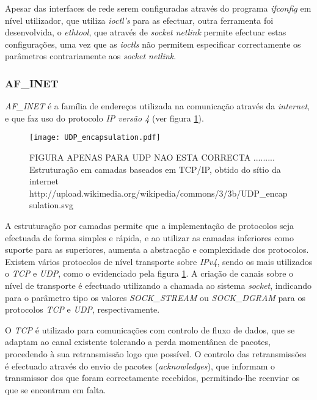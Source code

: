 Apesar das interfaces de rede serem configuradas através do programa \textit{ifconfig} em nível utilizador, que utiliza \textit{ioctl's} para as efectuar, outra ferramenta foi desenvolvida, o \textit{ethtool}, que através de \textit{socket netlink} permite efectuar estas configurações, uma vez que as \textit{ioctls} não permitem especificar correctamente os parâmetros contrariamente aos \textit{socket netlink}.

\subsubsection{AF\_INET}
\label{subsub:af_inet}

\textit{AF\_INET} é a família de endereços utilizada na comunicação através da \textit{internet}, e que faz uso do protocolo \textit{IP versão 4} (ver figura \ref{fig:stack_tcp_ip}).

\begin{figure}[ht]
\centering
\texttt{[image: UDP\_encapsulation.pdf]}
\caption{FIGURA APENAS PARA UDP NAO ESTA CORRECTA ......... Estruturação em camadas baseados em TCP/IP, obtido do sítio da internet http://upload.wikimedia.org/wikipedia/commons/3/3b/UDP\_encapsulation.svg}
\label{fig:stack_tcp_ip}
\end{figure}


A estruturação por camadas permite que a implementação de protocolos seja efectuada de forma simples e rápida, e ao utilizar as camadas inferiores como suporte para as superiores, aumenta a abstracção e complexidade dos protocolos.
Existem vários protocolos de nível transporte sobre \textit{IPv4}, sendo os mais utilizados o \textit{TCP} e \textit{UDP}, como o evidenciado pela figura \ref{fig:stack_tcp_ip}.
A criação de canais sobre o nível de transporte é efectuado utilizando a chamada ao sistema \textit{socket}, indicando para o parâmetro tipo os valores \textit{SOCK\_STREAM} ou \textit{SOCK\_DGRAM} para os protocolos \textit{TCP} e \textit{UDP}, respectivamente.

O \textit{TCP} é utilizado para comunicações com controlo de fluxo de dados, que se adaptam ao canal existente tolerando a perda momentânea de pacotes, procedendo à sua retransmissão logo que possível.
O controlo das retransmissões é efectuado através do envio de pacotes (\textit{acknowledges}), que informam o transmissor dos que foram correctamente recebidos, permitindo-lhe reenviar os que se encontram em falta.

